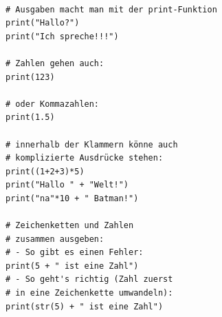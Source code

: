 	\paragraph*{}
	\begin{lstlisting}
# Ausgaben macht man mit der print-Funktion
print("Hallo?")
print("Ich spreche!!!")

# Zahlen gehen auch:
print(123)

# oder Kommazahlen:
print(1.5)

# innerhalb der Klammern könne auch 
# komplizierte Ausdrücke stehen:
print((1+2+3)*5)
print("Hallo " + "Welt!")
print("na"*10 + " Batman!")

# Zeichenketten und Zahlen 
# zusammen ausgeben:
# - So gibt es einen Fehler:
print(5 + " ist eine Zahl")
# - So geht's richtig (Zahl zuerst 
# in eine Zeichenkette umwandeln):
print(str(5) + " ist eine Zahl") 
	\end{lstlisting}
	
	
	
